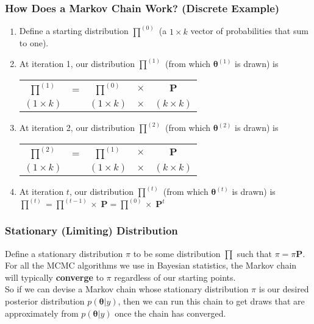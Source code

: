 \documentclass{beamer}
\begin{document}
\begin{frame}
\frametitle{How Does a Markov Chain Work? (Discrete Example)}
\pause
\begin{enumerate}
\item Define a starting distribution $\prod^{(0)}$ (a $1 \times k$
vector of probabilities that sum to one).
\pause
\medskip
\item At iteration 1, our distribution $\prod^{(1)}$ (from which $\bm{\theta}^{(1)}$ is drawn) is
\begin{center}
\begin{tabular}{ccccc}
$\prod^{(1)}$ & = & $\prod^{(0)}$ & $\times$ & $\bm{P}$\\
$(1 \times k)$ & & $(1 \times k)$ & $\times$ & $(k \times k)$
\end{tabular}
\end{center}
\pause
\medskip
\item At iteration 2, our distribution $\prod^{(2)}$ (from which $\bm{\theta}^{(2)}$ is drawn) is
\begin{center}
\begin{tabular}{ccccc}
$\prod^{(2)}$ & = & $\prod^{(1)}$ & $\times$ & $\bm{P}$\\
$(1 \times k)$ & & $(1 \times k)$ & $\times$ & $(k \times k)$
\end{tabular}
\end{center}
\medskip
\pause
\item At iteration $t$, our distribution $\prod^{(t)}$ (from which
$\bm{\theta}^{(t)}$ is drawn) is $\prod^{(t)}  = \prod^{(t-1)} \times
\; \bm{P} = \prod^{(0)}
\times \; \bm{P}^t$
\end{enumerate}
\end{frame}

\begin{frame}
\frametitle{Stationary (Limiting) Distribution}
\pause
Define a stationary distribution $\pi$ to be some distribution
$\prod$ such that $\pi = \pi \bm{P}$.  \\
\bigskip
\pause
For all the MCMC algorithms we use in Bayesian statistics, the Markov
chain will typically \textbf{converge} to $\pi$ regardless of our starting points.\\
\bigskip
\pause
So if we can devise a Markov chain whose stationary distribution $\pi$
is our desired posterior distribution $p(\bm{\theta} | y)$, then we
can run this chain to get draws that are approximately from
$p(\bm{\theta} | y)$ once the chain has converged.\\
\end{frame}
\end{document}

